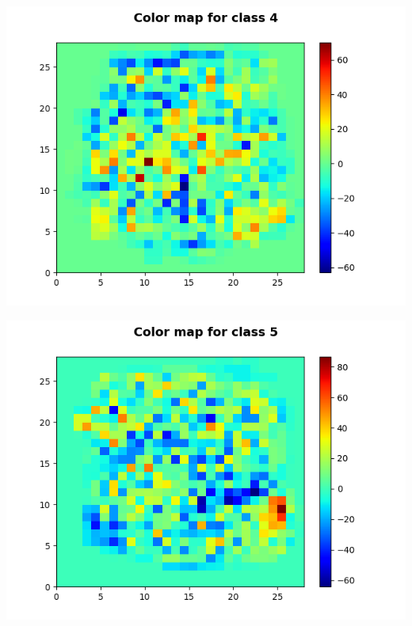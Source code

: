 \documentclass[11pt]{article}
\begin{document}
\begin{center}
\includegraphics[scale=0.80]{part1.ec2/digit4.png}
\end{center}

\begin{center}
\includegraphics[scale=0.80]{part1.ec2/digit5.png}
\end{center}
\end{document}
